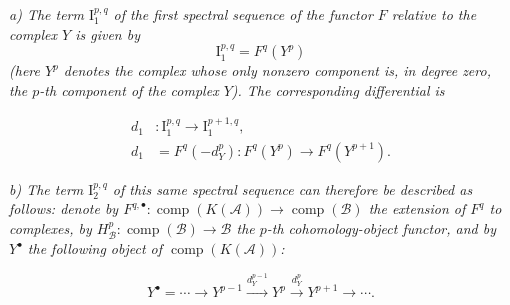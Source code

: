 \noindent\textit{a) The term $\mathrm I_1^{p,q}$ of the first spectral
sequence of the functor $F$ relative to the complex $Y$ is given by}
\[
\mathrm I_1^{p,q}=F^q(Y^p)
\]
\noindent\textit{(here $Y^p$ denotes the complex whose only nonzero
component is, in degree zero, the $p$-th component of the complex $Y$).
The corresponding differential is}

\[
\begin{aligned}
d_1&\colon\mathrm I_1^{p,q}\longrightarrow\mathrm I_1^{p+1,q},\\
d_1&=F^q(-d_Y^p)\colon F^q(Y^p)\longrightarrow F^q(Y^{p+1}).
\end{aligned}
\]

\noindent\textit{b) The term $\mathrm I_2^{p,q}$ of this same spectral
sequence can therefore be described as follows: denote by
$F^{q,\bullet}\colon\operatorname{comp}(K(\mathcal A))
\longrightarrow\operatorname{comp}(\mathcal B)$ the extension of $F^q$
to complexes, by $H_{\mathcal B}^p\colon\operatorname{comp}(\mathcal B)
\longrightarrow\mathcal B$ the $p$-th cohomology-object functor, and by
$Y^\bullet$ the following object of $\operatorname{comp}(K(\mathcal A))$:}

\[
Y^\bullet=\cdots\longrightarrow Y^{p-1}
\xrightarrow{d_Y^{p-1}}Y^p\xrightarrow{d_Y^p}Y^{p+1}
\longrightarrow\cdots.
\]
\endgroup
